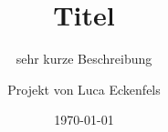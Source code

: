 \documentclass[12pt, titlepage, parskip=half-]{scrreprt}
\begin{document}
% 
\begin{titlepage}
  \title{Titel}
  \subtitle{sehr kurze Beschreibung}
  \titlehead{}
  
  \author{Projekt von Luca Eckenfels}
  \publishers{ Angefertigt am Schiller-Gymnasium Offenburg \\
    \vspace*{2ex} Unterstützender Lehrer:\\ Herr Czernohous\\
    
  }
  \date{\today}
\end{titlepage}

\maketitle
\end{document}
